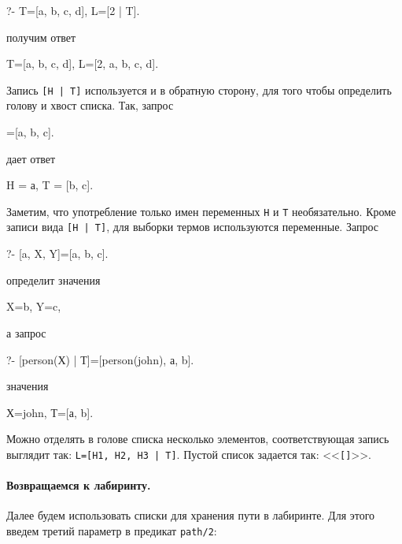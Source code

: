 \documentclass[a4paper,14pt, openany, twoside, final]{extbook} %
\begin{document}
\begin{proexp}
?- T=[a, b, c, d], L=[2 | T].
\end{proexp}

\noindent получим ответ

\begin{proexp}
T=[a, b, c, d], L=[2, a, b, c, d].
\end{proexp}

  Запись {\tt [Н | Т]} используется и в обратную сторону, для того чтобы определить голову и хвост списка.  Так, запрос

\begin{proexp}
[H | T]=[a, b, c].
\end{proexp}

\noindent дает ответ

\begin{proexp}
H = а, T = [b, c].
\end{proexp}


Заметим, что употребление только имен переменных {\tt Н} и {\tt Т} необязательно.  Кроме записи вида {\tt [H | T]}, для выборки термов используются переменные. Запрос

\begin{proexp}
?- [a, X, Y]=[a, b, c].
\end{proexp}

\noindent определит значения

\begin{proexp}
X=b, Y=c,
\end{proexp}

\noindent а запрос

\begin{proexp}
?- [person(Х) | Т]=[person(john), а, b].
\end{proexp}

\noindent значения

\begin{proexp}
Х=john, Т=[а, b].
\end{proexp}

  Можно отделять в голове списка несколько элементов, соответствующая запись выглядит так: {\tt L=[H1, H2, H3 | T]}.  Пустой список задается так: <<\texttt{[]}>>.

\paragraph{Возвращаемся к лабиринту.} \label{par:mazelist} Далее будем использовать списки для хранения пути в лабиринте.  Для этого введем третий параметр в предикат \texttt{path/2}:
\end{document}
